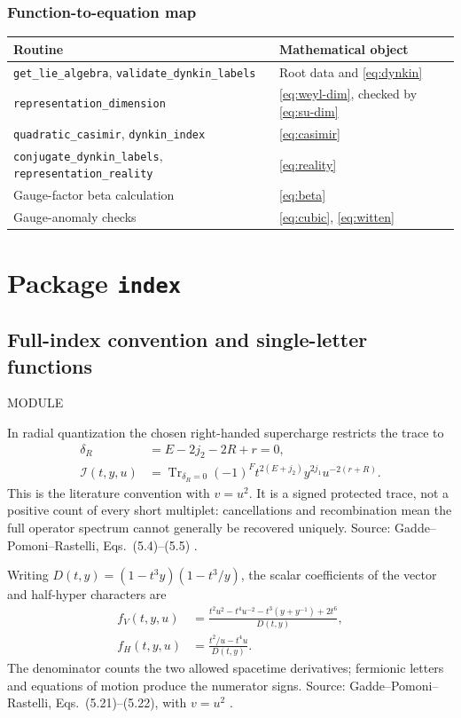 \documentclass[11pt,a4paper]{article}
\numberwithin{equation}{section}
\newcommand{\code}[1]{{\small\nolinkurl{#1}}}
\newcommand{\file}[1]{\par{\small\sffamily\color{muted}MODULE \quad\texttt{\detokenize{#1}}}\par}
\newcommand{\Tr}{\operatorname{Tr}}
\newcommand{\src}[1]{{\small\color{muted}Source: #1.}\par}
\begin{document}
\subsubsection{Function-to-equation map}
\begin{tabularx}{\textwidth}{@{}Yp{43mm}@{}}
\toprule Routine & Mathematical object\\\midrule
\code{get_lie_algebra}, \code{validate_dynkin_labels} & Root data and \eqref{eq:dynkin}\\
\code{representation_dimension} & \eqref{eq:weyl-dim}, checked by \eqref{eq:su-dim}\\
\code{quadratic_casimir}, \code{dynkin_index} & \eqref{eq:casimir}\\
\code{conjugate_dynkin_labels}, \code{representation_reality} & \eqref{eq:reality}\\
Gauge-factor beta calculation & \eqref{eq:beta}\\
Gauge-anomaly checks & \eqref{eq:cubic}, \eqref{eq:witten}\\\bottomrule
\end{tabularx}

\clearpage
\section{Package \texttt{index}}\label{sec:index}
\subsection{Full-index convention and single-letter functions}
\file{index/n2_theory_index.py}
In radial quantization the chosen right-handed supercharge restricts the trace to
\begin{align}
 \delta_R&=E-2j_2-2R+r=0,\label{eq:delta}\\
 \mathcal I(t,y,u)&=\Tr_{\delta_R=0}(-1)^F
 t^{2(E+j_2)}y^{2j_1}u^{-2(r+R)}.\label{eq:full-trace}
\end{align}
This is the literature convention with $v=u^2$. It is a signed protected trace,
not a positive count of every short multiplet: cancellations and recombination
mean the full operator spectrum cannot generally be recovered uniquely.
\src{Gadde--Pomoni--Rastelli, Eqs.~(5.4)--(5.5) \cite{gpr}}

Writing $D(t,y)=(1-t^3y)(1-t^3/y)$, the scalar coefficients of the vector and
half-hyper characters are
\begin{align}
 f_V(t,y,u)&=\frac{t^2u^2-t^4u^{-2}-t^3(y+y^{-1})+2t^6}{D(t,y)},
 \label{eq:vector-letter}\\
 f_H(t,y,u)&=\frac{t^2/u-t^4u}{D(t,y)}.\label{eq:hyper-letter}
\end{align}
The denominator counts the two allowed spacetime derivatives; fermionic letters
and equations of motion produce the numerator signs.
\src{Gadde--Pomoni--Rastelli, Eqs.~(5.21)--(5.22), with $v=u^2$ \cite{gpr}}
\end{document}

